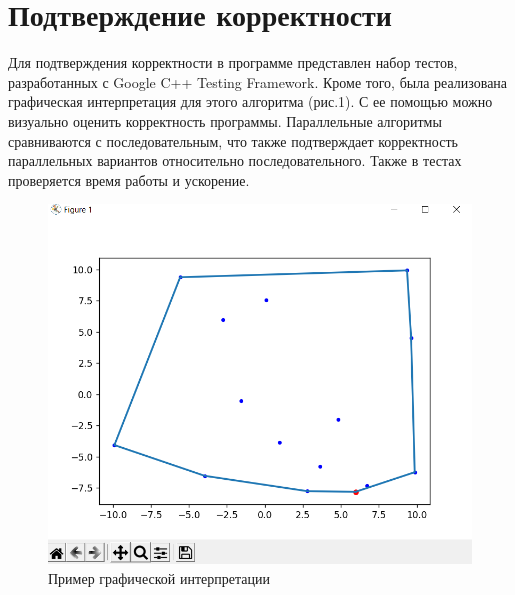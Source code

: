 \documentclass{report}
\begin{document}
\newpage

\section*{Подтверждение корректности}
Для подтверждения корректности в программе представлен набор тестов, разработанных с  Google C++ Testing Framework. Кроме того, была реализована графическая интерпретация для этого алгоритма (рис.1). С ее помощью можно визуально оценить корректность программы. Параллельные алгоритмы сравниваются с последовательным, что также подтверждает корректность параллельных вариантов относительно последовательного. Также в тестах проверяется время работы и ускорение.


\begin{figure}[h]
	
	\centering
	
	\includegraphics[width=0.8\linewidth]{../../modules/task_1/zaitseva_k_jarvis/images/graf.png}
	
	\caption{Пример графической интерпретации}
	
	\label{fig:mpr}
	
\end{figure}
\newpage

\end{document}
